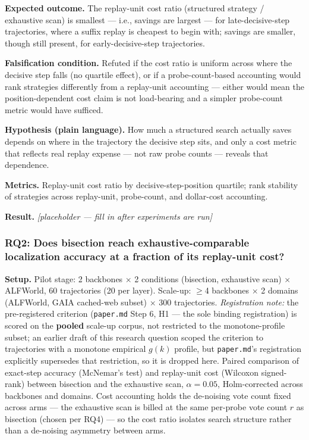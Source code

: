 \documentclass[11pt]{article}
\newcommand{\ph}{\textit{[placeholder --- fill in after experiments are run]}}
\begin{document}
\textbf{Expected outcome.} The replay-unit cost ratio (structured strategy / exhaustive scan) is smallest --- i.e., savings are largest --- for late-decisive-step trajectories, where a suffix replay is cheapest to begin with; savings are smaller, though still present, for early-decisive-step trajectories.

\textbf{Falsification condition.} Refuted if the cost ratio is uniform across where the decisive step falls (no quartile effect), or if a probe-count-based accounting would rank strategies differently from a replay-unit accounting --- either would mean the position-dependent cost claim is not load-bearing and a simpler probe-count metric would have sufficed.

\textbf{Hypothesis (plain language).} How much a structured search actually saves depends on where in the trajectory the decisive step sits, and only a cost metric that reflects real replay expense --- not raw probe counts --- reveals that dependence.

\textbf{Metrics.} Replay-unit cost ratio by decisive-step-position quartile; rank stability of strategies across replay-unit, probe-count, and dollar-cost accounting.

\textbf{Result.} \ph

\subsubsection{RQ2: Does bisection reach exhaustive-comparable localization accuracy at a fraction of its replay-unit cost?}
\textbf{Setup.} Pilot stage: 2 backbones $\times$ 2 conditions (bisection, exhaustive scan) $\times$ ALFWorld, 60 trajectories (20 per layer). Scale-up: $\geq$4 backbones $\times$ 2 domains (ALFWorld, GAIA cached-web subset) $\times$ 300 trajectories. \emph{Registration note:} the pre-registered criterion (\texttt{paper.md} Step 6, H1 --- the sole binding registration) is scored on the \textbf{pooled} scale-up corpus, not restricted to the monotone-profile subset; an earlier draft of this research question scoped the criterion to trajectories with a monotone empirical $g(k)$ profile, but \texttt{paper.md}'s registration explicitly supersedes that restriction, so it is dropped here. Paired comparison of exact-step accuracy (McNemar's test) and replay-unit cost (Wilcoxon signed-rank) between bisection and the exhaustive scan, $\alpha = 0.05$, Holm-corrected across backbones and domains. Cost accounting holds the de-noising vote count fixed across arms --- the exhaustive scan is billed at the same per-probe vote count $r$ as bisection (chosen per RQ4) --- so the cost ratio isolates search structure rather than a de-noising asymmetry between arms.
\end{document}
